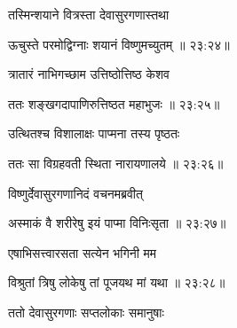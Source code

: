 {\devanagarifont तस्मिन्शयाने वित्रस्ता देवासुरगणास्तथा \thinspace{\dandab} \dontdisplaylinenum }%


{\devanagarifont ऊचुस्ते परमोद्विग्नाः शयानं विष्णुमच्युतम् {॥ २३:२४॥} \veg\dontdisplaylinenum }%
 
{\devanagarifont त्रातारं नाभिगच्छाम उत्तिष्ठोत्तिष्ठ केशव \thinspace{\dandab} \dontdisplaylinenum }%
 

{\devanagarifont ततः शङ्खगदापाणिरुत्तिष्ठत महाभुजः {॥ २३:२५॥} \veg\dontdisplaylinenum }%
 
{\devanagarifont उत्थितश्च विशालाक्षः पाप्मना तस्य पृष्ठतः \thinspace{\dandab} \dontdisplaylinenum }%


{\devanagarifont ततः सा विग्रहवती स्थिता नारायणालये {॥ २३:२६॥} \veg\dontdisplaylinenum }%

{\devanagarifont विष्णुर्देवासुरगणानिदं वचनमब्रवीत् \thinspace{\dandab} \dontdisplaylinenum }%


{\devanagarifont अस्माकं वै शरीरेषु इयं पाप्मा विनिःसृता {॥ २३:२७॥} \veg\dontdisplaylinenum }%

{\devanagarifont एषाभिसत्त्वारसता सत्येन भगिनी मम \thinspace{\dandab} \dontdisplaylinenum }%


{\devanagarifont विश्रुतां त्रिषु लोकेषु तां पूजयथ मां यथा {॥ २३:२८॥} \veg\dontdisplaylinenum }%

{\devanagarifont ततो देवासुरगणाः सप्तलोकाः समानुषाः \thinspace{\dandab} \dontdisplaylinenum }%

